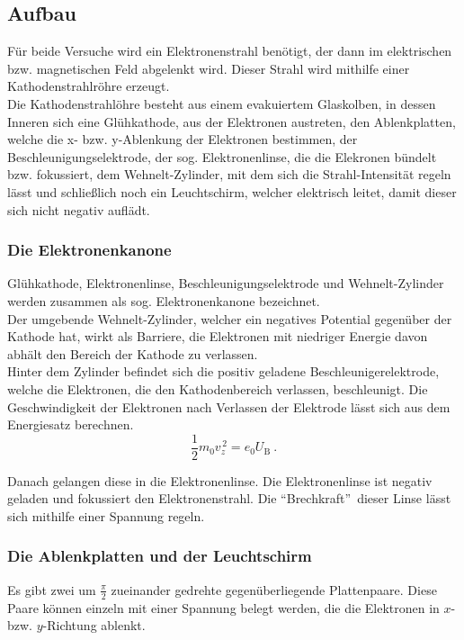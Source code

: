 \subsection{Aufbau}
Für beide Versuche wird ein Elektronenstrahl benötigt, der dann im
elektrischen bzw. magnetischen Feld abgelenkt wird. Dieser Strahl wird
mithilfe einer Kathodenstrahlröhre erzeugt.\\

Die Kathodenstrahlöhre besteht aus einem evakuiertem Glaskolben, in dessen Inneren sich eine Glühkathode, aus der Elektronen austreten, den Ablenkplatten, welche die x- bzw. y-Ablenkung der Elektronen bestimmen, der Beschleunigungselektrode, der sog. Elektronenlinse, die die Elekronen bündelt bzw. fokussiert, dem Wehnelt-Zylinder, mit dem sich die Strahl-Intensität regeln lässt und schließlich noch ein Leuchtschirm, welcher elektrisch leitet, damit dieser sich nicht negativ auflädt.

\subsubsection{Die Elektronenkanone}
Glühkathode, Elektronenlinse, Beschleunigungselektrode und Wehnelt-Zylinder werden zusammen als sog. Elektronenkanone bezeichnet.\\
Der umgebende Wehnelt-Zylinder, welcher ein negatives Potential
gegenüber der Kathode hat, wirkt als Barriere, die Elektronen mit
niedriger Energie davon abhält den Bereich der Kathode zu
verlassen.\\
Hinter dem Zylinder befindet sich die positiv geladene
Beschleunigerelektrode, welche die Elektronen, die den Kathodenbereich
verlassen, beschleunigt. Die Geschwindigkeit der Elektronen nach
Verlassen der Elektrode lässt sich aus dem Energiesatz berechnen.
%
\begin{equation}
  \frac{1}{2} m_0 v_z^{\,2} = e_0 U_\text{B} \:.
\end{equation}

Danach gelangen diese in die Elektronenlinse. Die Elektronenlinse ist negativ geladen und fokussiert den Elektronenstrahl. Die \textquotedblleft Brechkraft\textquotedblright \, dieser Linse lässt sich mithilfe einer Spannung regeln.

\subsubsection{Die Ablenkplatten und der Leuchtschirm}
Es gibt zwei um $\frac{\pi}{2}$ zueinander gedrehte gegenüberliegende
Plattenpaare. Diese Paare können einzeln mit einer Spannung belegt
werden, die die Elektronen in $x$- bzw. $y$-Richtung ablenkt.

